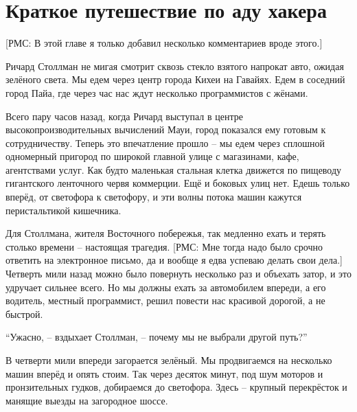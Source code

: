 

\chapter{Краткое путешествие по аду хакера}

[РМС: В этой главе я только добавил несколько комментариев вроде этого.]

Ричард Столлман не мигая смотрит сквозь стекло взятого напрокат авто, ожидая зелёного света. Мы едем через центр города Кихеи на Гавайях. Едем в соседний город Пайа, где через час нас ждут несколько программистов с жёнами.

Всего пару часов назад, когда Ричард выступал в центре высокопроизводительных вычислений Мауи, город показался ему готовым к сотрудничеству. Теперь это впечатление прошло -- мы едем через сплошной одномерный пригород по широкой главной улице с магазинами, кафе, агентствами услуг. Как будто маленькая стальная клетка движется по пищеводу гигантского ленточного червя коммерции. Ещё и боковых улиц нет. Едешь только вперёд, от светофора к светофору, и эти волны потока машин кажутся перистальтикой кишечника.

Для Столлмана, жителя Восточного побережья, так медленно ехать и терять столько времени -- настоящая трагедия. [РМС: Мне тогда надо было срочно ответить на электронное письмо, да и вообще я едва успеваю делать свои дела.] Четверть мили назад можно было повернуть несколько раз и объехать затор, и это удручает сильнее всего. Но мы должны ехать за автомобилем впереди, а его водитель, местный программист, решил повести нас красивой дорогой, а не быстрой.

\enquote{Ужасно, -- вздыхает Столлман, -- почему мы не выбрали другой путь?}

В четверти мили впереди загорается зелёный. Мы продвигаемся на несколько машин вперёд и опять стоим. Так через десяток минут, под шум моторов и пронзительных гудков, добираемся до светофора. Здесь -- крупный перекрёсток и манящие выезды на загородное шоссе.

